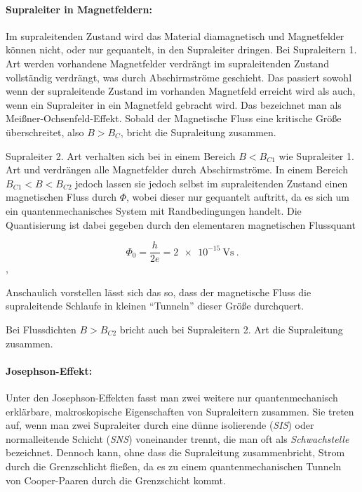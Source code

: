 \documentclass[a4paper,ngerman]{scrartcl}
\begin{document}
\paragraph{Supraleiter in Magnetfeldern:
}
Im supraleitenden Zustand wird das Material diamagnetisch und
Magnetfelder können nicht, oder nur gequantelt, in den Supraleiter
dringen. 
Bei Supraleitern 1. Art werden vorhandene Magnetfelder verdrängt im
supraleitenden Zustand vollständig verdrängt, was durch Abschirmströme
geschieht. 
Das passiert sowohl wenn der supraleitende Zustand im vorhanden
Magnetfeld erreicht wird als auch, wenn ein Supraleiter in ein
Magnetfeld gebracht wird. Das bezeichnet man als
Meißner-Ochsenfeld-Effekt.
Sobald der Magnetische Fluss eine kritische Größe überschreitet,
also $B > B_C$, bricht die Supraleitung zusammen.

Supraleiter 2. Art verhalten sich bei in einem Bereich $B < B_{C1}$
wie Supraleiter 1. Art und verdrängen alle Magnetfelder durch
Abschirmströme. 
In einem Bereich $B_{C1} < B < B_{C2}$ jedoch lassen sie jedoch selbst
im supraleitenden Zustand einen magnetischen Fluss durch $\Phi$, wobei
dieser nur gequantelt auftritt,
da es sich um ein quantenmechanisches System mit Randbedingungen
handelt. Die Quantisierung ist dabei gegeben durch den elementaren
magnetischen Flussquant

\begin{equation}
  \label{eq:phi0}
  \Phi_0 = \frac{h}{2 e} = \SI{2e-15}{\volt\second}~.
\end{equation},

Anschaulich vorstellen lässt sich das so, 
dass der magnetische Fluss die
supraleitende Schlaufe in kleinen "`Tunneln"' dieser Größe durchquert.


Bei Flussdichten $B > B_{C2}$ bricht auch bei Supraleitern 2. Art die
Supraleitung zusammen.


\paragraph{Josephson-Effekt:} Unter den Josephson-Effekten fasst man
zwei weitere nur quantenmechanisch erklärbare, makroskopische
Eigenschaften von Supraleitern zusammen. 
Sie treten auf, wenn man zwei Supraleiter durch eine dünne
isolierende (\emph{SIS}) oder normalleitende
Schicht (\emph{SNS}) voneinander trennt,
die man oft als \emph{Schwachstelle} bezeichnet. 
Dennoch kann, ohne dass die Supraleitung zusammenbricht, Strom durch die Grenzschlicht fließen, da es zu einem
quantenmechanischen Tunneln von Cooper-Paaren durch die Grenzschicht kommt.
\end{document}
